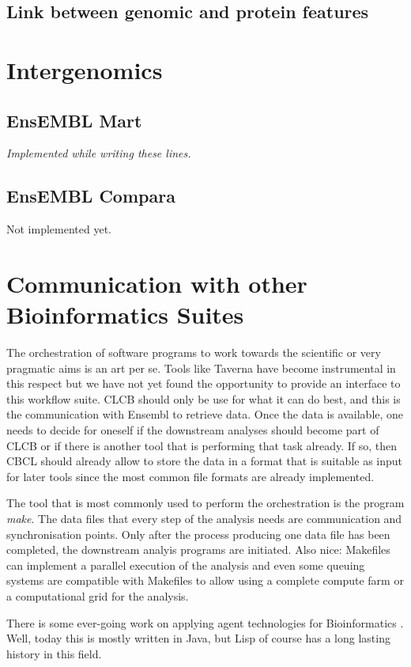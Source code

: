 \documentclass{book}
\newcommand\ensembl{EnsEMBL }
\newcommand\CLCB{CLCB }
\begin{document}
\subsection{Link between genomic and protein features}

\section{Intergenomics}

\subsection{\ensembl Mart}

{\em Implemented while writing these lines.}

\subsection{\ensembl Compara}

Not implemented yet.

\section{Communication with other Bioinformatics Suites}

The orchestration of software programs to work towards the scientific
or very pragmatic aims is an art per se. Tools like Taverna have become
instrumental in this respect but we have not yet found the opportunity
to provide an interface to this workflow suite. \CLCB should only be
use for what it can do best, and this is the communication with Ensembl
to retrieve data. Once the data is available, one needs to decide for
oneself if the downstream analyses should become part of \CLCB or if
there is another tool that is performing that task already. If so,
then CBCL should already allow to store the data in a format that is
suitable as input for later tools since the most common file formats
are already implemented.

The tool that is most commonly used to perform the orchestration is 
the program {\em make}. The data files that every step of the analysis needs
are communication and synchronisation points. Only after the process producing one
data file has been completed, the downstream analyis programs are initiated.
Also nice: Makefiles can implement a parallel execution of the analysis and 
even some queuing systems are compatible with Makefiles to allow using a complete
compute farm or a computational grid for the analysis.

There is some ever-going work on applying agent technologies for
Bioinformatics \cite{agents:2007}. Well, today this is mostly written
in Java, but Lisp of course has a long lasting history in this field.



\end{document}
